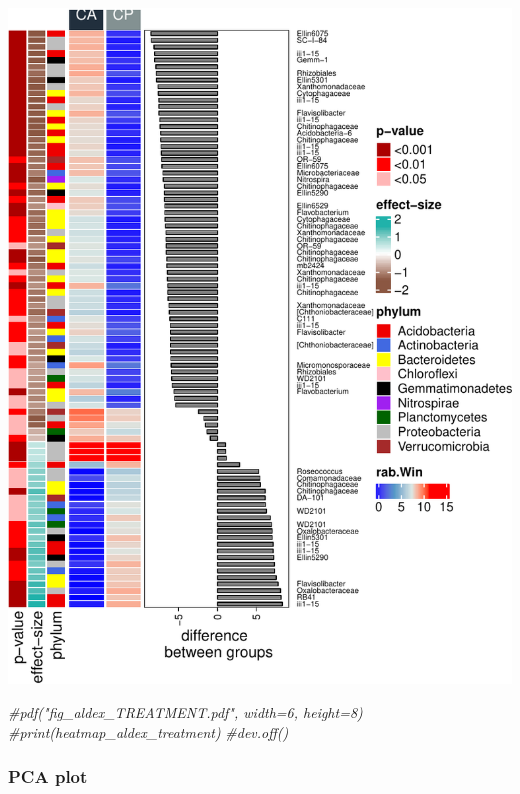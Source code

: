 \documentclass[]{interact}
\theoremstyle{plain}%
\theoremstyle{definition}
\theoremstyle{remark}
\newenvironment{Shaded}{\begin{snugshade}}{\end{snugshade}}
\newcommand{\CommentTok}[1]{\textcolor[rgb]{0.56,0.35,0.01}{\textit{#1}}}
\begin{document}
\begin{center}\includegraphics{Doc_pdf_files/figure-latex/unnamed-chunk-28-1} \end{center}

\begin{Shaded}
\begin{Highlighting}[]
\CommentTok{\#pdf("fig\_aldex\_TREATMENT.pdf", width=6, height=8)}
\CommentTok{\#print(heatmap\_aldex\_treatment)}
\CommentTok{\#dev.off()}
\end{Highlighting}
\end{Shaded}

\hypertarget{pca-plot-1}{%
\subsubsection{PCA plot}\label{pca-plot-1}}
\end{document}
